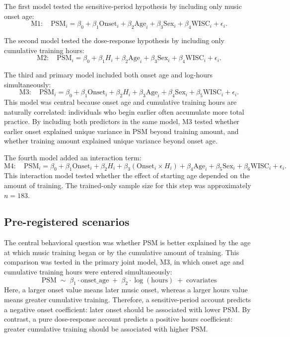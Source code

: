 \documentclass[11pt]{article}
\begin{document}
The first model tested the sensitive-period hypothesis by including only music onset age:
\[
\mathrm{M1:}\quad
\mathrm{PSM}_i
=
\beta_0
+
\beta_1 \mathrm{Onset}_i
+
\beta_2 \mathrm{Age}_i
+
\beta_3 \mathrm{Sex}_i
+
\beta_4 \mathrm{WISC}_i
+
\epsilon_i.
\]

The second model tested the dose-response hypothesis by including only cumulative training hours:
\[
\mathrm{M2:}\quad
\mathrm{PSM}_i
=
\beta_0
+
\beta_1 H_i
+
\beta_2 \mathrm{Age}_i
+
\beta_3 \mathrm{Sex}_i
+
\beta_4 \mathrm{WISC}_i
+
\epsilon_i.
\]

The third and primary model included both onset age and log-hours simultaneously:
\[
\mathrm{M3:}\quad
\mathrm{PSM}_i
=
\beta_0
+
\beta_1 \mathrm{Onset}_i
+
\beta_2 H_i
+
\beta_3 \mathrm{Age}_i
+
\beta_4 \mathrm{Sex}_i
+
\beta_5 \mathrm{WISC}_i
+
\epsilon_i.
\]
This model was central because onset age and cumulative training hours are naturally correlated: individuals who begin earlier often accumulate more total practice. By including both predictors in the same model, M3 tested whether earlier onset explained unique variance in PSM beyond training amount, and whether training amount explained unique variance beyond onset age.

The fourth model added an interaction term:
\[
\mathrm{M4:}\quad
\mathrm{PSM}_i
=
\beta_0
+
\beta_1 \mathrm{Onset}_i
+
\beta_2 H_i
+
\beta_3 \left(\mathrm{Onset}_i \times H_i\right)
+
\beta_4 \mathrm{Age}_i
+
\beta_5 \mathrm{Sex}_i
+
\beta_6 \mathrm{WISC}_i
+
\epsilon_i.
\]
This interaction model tested whether the effect of starting age depended on the amount of training. The trained-only sample size for this step was approximately $n=183$.

\subsection{Pre-registered scenarios}
The central behavioral question was whether PSM is better explained by the age at which music training began or by the cumulative amount of training. This comparison was tested in the primary joint model, M3, in which onset age and cumulative training hours were entered simultaneously:
\begin{equation*}
\mathrm{PSM} \;\sim\; \beta_1\cdot \mathrm{onset\_age} \;+\; \beta_2\cdot \log(\mathrm{hours}) \;+\; \mathrm{covariates}
\end{equation*}
Here, a larger onset value means later music onset, whereas a larger hours value means greater cumulative training. Therefore, a sensitive-period account predicts a negative onset coefficient: later onset should be associated with lower PSM. By contrast, a pure dose-response account predicts a positive hours coefficient: greater cumulative training should be associated with higher PSM.
\end{document}
